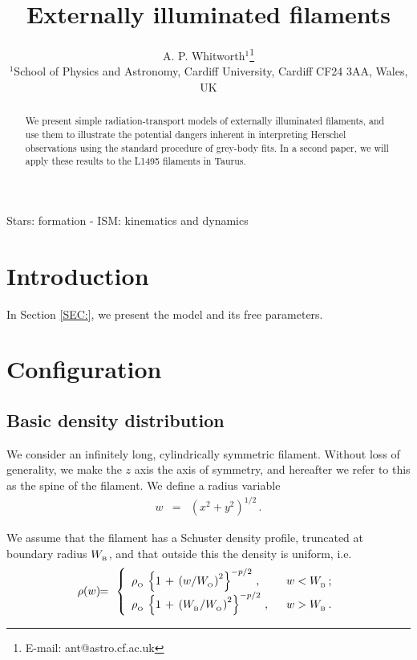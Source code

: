 \documentclass[usenatbib]{mn2e}
\title[Externally illuminated filaments]{Externally illuminated filaments}
\author[A. P. Whitworth]
{A. P. Whitworth$^{1}$\thanks{E-mail: ant@astro.cf.ac.uk} \\
$^{1}$School of Physics and Astronomy, Cardiff University, Cardiff CF24 3AA, Wales, UK}
\newcommand{\subB}{_{_{\rm B}}}
\newcommand{\subO}{_{_{\rm O}}}
\numberwithin{equation}{section}
\begin{document}
\pagerange{\pageref{firstpage}--\pageref{lastpage}} 
\maketitle
\label{firstpage}

\begin{abstract} 
We present simple radiation-transport models of externally illuminated filaments, and use them to illustrate the potential dangers inherent in interpreting Herschel observations using the standard procedure of grey-body fits. In a second paper, we will apply these results to the L1495 filaments in Taurus.
\end{abstract}

\begin{keywords}
Stars: formation - ISM: kinematics and dynamics
\end{keywords}





\section{Introduction}

In Section \ref{SEC:}, we present the model and its free parameters.





\section{Configuration}\label{SEC:Config}

\subsection{Basic density distribution}

We consider an infinitely long, cylindrically symmetric filament. Without loss of generality, we make the $z$ axis the axis of symmetry, and hereafter we refer to this as the spine of the filament. We define a radius variable
\begin{eqnarray}
w&=&\left(x^2+y^2\right)^{1/2}\,.
\end{eqnarray}

We assume that the filament has a Schuster density profile, truncated at boundary radius $W\subB$, and that outside this the density is uniform, i.e.
\begin{eqnarray}
\rho(w)\!&\!=\!&\!\left\{\begin{array}{ll}
\rho\subO\,\left\{1\,+\,\left(w/W\subO\right)^2\right\}^{-p/2}\,,\hspace{0.5cm}&w<W\subB\,;\\
\rho\subO\,\left\{1\,+\,\left(W\subB/W\subO\right)^2\right\}^{-p/2}\,,&w>W\subB\,.\\
\end{array}\right.
\end{eqnarray}
\end{document}
